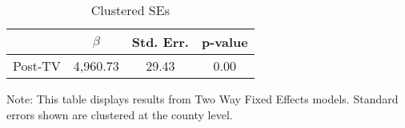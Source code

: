 \noindent 

\begin{table}[H]

\caption{Clustered SEs \label{tab:regression_cluster}}

\medskip{}



\begin{centering}

\begin{tabular}{cccc}

\hline 

 & $\beta$ & Std. Err. & p-value\tabularnewline

\hline 

Post-TV & 4,960.73 & 29.43 & 0.00\tabularnewline

\hline 

\end{tabular}

\par\end{centering}

\begin{centering}

\medskip{}

\par\end{centering}

{\footnotesize{}Note: This table displays results from Two Way Fixed Effects models. Standard errors shown are clustered at the county level.}{\footnotesize\par}

\end{table}